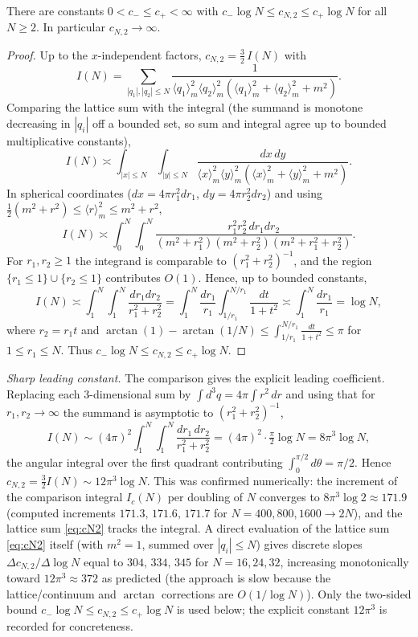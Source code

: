 \begin{qonelemma}\label{lem:logdiv}
There are constants $0<c_-\le c_+<\infty$ with $c_-\log N\le c_{N,2}\le c_+\log N$ for
all $N\ge2$. In particular $c_{N,2}\to\infty$.
\end{qonelemma}
\begin{proof}
Up to the $x$-independent factors, $c_{N,2}=\tfrac32\,I(N)$ with
\[
I(N)=\sum_{|q_1|,|q_2|\le N}\frac{1}{\langle q_1\rangle_m^2\langle q_2\rangle_m^2(\langle q_1\rangle_m^2+\langle q_2\rangle_m^2+m^2)} .
\]
Comparing the lattice sum with the integral (the summand is monotone decreasing in
$|q_i|$ off a bounded set, so sum and integral agree up to bounded multiplicative
constants),
\[
I(N)\asymp\int_{|x|\le N}\!\!\int_{|y|\le N}\frac{dx\,dy}{\langle x\rangle_m^2\langle y\rangle_m^2(\langle x\rangle_m^2+\langle y\rangle_m^2+m^2)} .
\]
In spherical coordinates ($dx=4\pi r_1^2dr_1$, $dy=4\pi r_2^2dr_2$) and using
$\tfrac12(m^2+r^2)\le\langle r\rangle_m^2\le m^2+r^2$,
\[
I(N)\asymp\int_0^N\!\!\int_0^N\frac{r_1^2r_2^2\,dr_1dr_2}{(m^2+r_1^2)(m^2+r_2^2)(m^2+r_1^2+r_2^2)} .
\]
For $r_1,r_2\ge1$ the integrand is comparable to $(r_1^2+r_2^2)^{-1}$, and the region
$\{r_1\le1\}\cup\{r_2\le1\}$ contributes $O(1)$. Hence, up to bounded constants,
\[
I(N)\asymp\int_1^N\!\!\int_1^N\frac{dr_1dr_2}{r_1^2+r_2^2}
=\int_1^N\frac{dr_1}{r_1}\int_{1/r_1}^{N/r_1}\frac{dt}{1+t^2}\asymp\int_1^N\frac{dr_1}{r_1}=\log N,
\]
where $r_2=r_1t$ and $\arctan(1)-\arctan(1/N)\le\int_{1/r_1}^{N/r_1}\frac{dt}{1+t^2}\le\pi$
for $1\le r_1\le N$. Thus $c_-\log N\le c_{N,2}\le c_+\log N$.
\end{proof}

\noindent\emph{Sharp leading constant.} The comparison gives the explicit leading
coefficient. Replacing each $3$-dimensional sum by $\int d^3q=4\pi\int r^2\,dr$ and using
that for $r_1,r_2\to\infty$ the summand is asymptotic to $(r_1^2+r_2^2)^{-1}$,
\[
I(N)\sim(4\pi)^2\!\int_1^N\!\!\int_1^N\frac{dr_1\,dr_2}{r_1^2+r_2^2}
=(4\pi)^2\cdot\tfrac{\pi}{2}\log N=8\pi^3\log N,
\]
the angular integral over the first quadrant contributing $\int_0^{\pi/2}d\theta=\pi/2$.
Hence $c_{N,2}=\tfrac32 I(N)\sim 12\pi^3\log N$. This was confirmed numerically: the
increment of the comparison integral $I_c(N)$ per doubling of $N$ converges to
$8\pi^3\log 2\approx171.9$ (computed increments $171.3,\,171.6,\,171.7$ for
$N=400,800,1600\to2N$), and the lattice sum \eqref{eq:cN2} tracks the integral. A direct
evaluation of the lattice sum \eqref{eq:cN2} itself (with $m^2=1$, summed over
$|q_i|\le N$) gives discrete slopes $\Delta c_{N,2}/\Delta\log N$ equal to
$304,\,334,\,345$ for $N=16,24,32$, increasing monotonically toward
$12\pi^3\approx372$ as predicted (the approach is slow because the lattice/continuum and
$\arctan$ corrections are $O(1/\log N)$). Only the
two-sided bound $c_-\log N\le c_{N,2}\le c_+\log N$ is used below; the explicit constant
$12\pi^3$ is recorded for concreteness.

